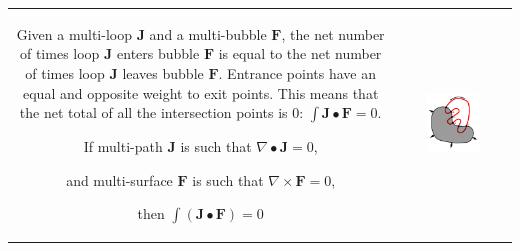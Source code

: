 \begin{tabular}{cc}
\parbox{0.5\textwidth}{
Given a multi-loop \(\mathbf{J}\) and a multi-bubble \(\mathbf{F}\), the net number of times loop \(\mathbf{J}\) enters bubble \(\mathbf{F}\) is equal to the net number of times loop \(\mathbf{J}\) leaves bubble \(\mathbf{F}\). Entrance points have an equal and opposite weight to exit points. This means that the net total of all the intersection points is \(0\): \(\int \mathbf{J} \bullet \mathbf{F} = 0\). 

\begin{thm}
If multi-path \(\mathbf{J}\) is such that \(\nabla \bullet \mathbf{J} = 0\), 

and multi-surface \(\mathbf{F}\) is such that \(\nabla \times \mathbf{F} = 0\), 

then \(\int (\mathbf{J} \bullet \mathbf{F}) = 0\)
\end{thm}
} & \parbox{0.5\textwidth}{
\includegraphics[width = 0.5\textwidth]{Intersections/Path-surface_intersections/closed_surface_and_closed_path}
}
\end{tabular}



